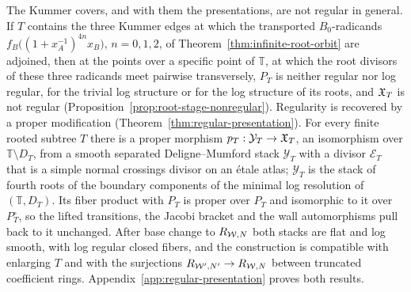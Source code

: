 The Kummer covers, and with them the presentations, are not regular in
general.  If $T$ contains the three Kummer edges at which the transported
$B_0$-radicands $f_B\bigl((1+x_A^{-1})^{4n}x_B\bigr)$, $n=0,1,2$, of
Theorem~\ref{thm:infinite-root-orbit} are adjoined, then at the points over
a specific point of $\mathbb T$, at which the root divisors of these three radicands
meet pairwise transversely, $P_T$ is neither regular nor log regular, for
the trivial log structure or for the log structure of its roots, and
$\mathfrak X_T$ is not regular (Proposition~\ref{prop:root-stage-nonregular}).
Regularity is recovered by a proper modification
(Theorem~\ref{thm:regular-presentation}).  For every finite rooted subtree
$T$ there is a proper morphism $p_T:\mathcal Y_T\to\mathfrak X_T$, an
isomorphism over $\mathbb T\setminus D_T$, from a smooth separated
Deligne--Mumford stack $\mathcal Y_T$ with a divisor $\mathcal E_T$ that is
a simple normal crossings divisor on an \'etale atlas; $\mathcal Y_T$ is the
stack of fourth roots of the boundary components of the minimal log
resolution of $(\mathbb T,D_T)$.  Its fiber product with $P_T$ is proper over
$P_T$ and isomorphic to it over $P_T^\circ$, so the lifted transitions, the
Jacobi bracket and the wall automorphisms pull back to it unchanged.  After
base change to $R_{\mathcal W,N}$ both stacks are flat and log smooth, with log
regular closed fibers, and the construction is compatible with enlarging
$T$ and with the surjections $R_{\mathcal W',N'}\to R_{\mathcal W,N}$ between
truncated coefficient rings.  Appendix~\ref{app:regular-presentation} proves
both results.

